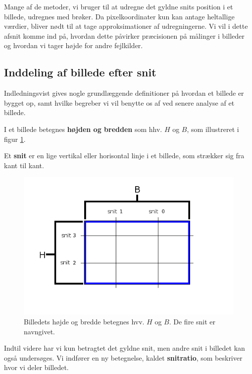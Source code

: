 {
\textsf{
Mange af de metoder, vi bruger til at udregne det gyldne snits position
i et billede, udregnes med brøker. Da pixelkoordinater kun kan antage
heltallige værdier, bliver nødt til at tage approksimationer af
udregningerne. Vi vil i dette afsnit komme ind på, hvordan dette
påvirker præcisionen på målinger i billeder og hvordan vi tager højde
for andre fejlkilder.
}

\subsection{Inddeling af billede efter snit}
Indledningsvist gives nogle grundlæggende definitioner på hvordan et
billede er bygget op, samt hvilke begreber vi vil benytte os af ved
senere analyse af et billede.

\begin{definition}
	I et billede betegnes \textbf{højden og bredden} som hhv. $H$ og
	$B$, som illustreret i figur \ref{cut}.
\end{definition}

\begin{definition}
    Et \textbf{snit} er en lige vertikal eller horisontal linje i et
    billede, som strækker sig fra kant til kant.
\end{definition}

\begin{figure}[!ht]
    \centering
    \includegraphics[scale=0.42,angle=0]{afsnit/vores_implementation/billeder/naiv_algoritme/Cut}
    \caption[]{Billedets højde og bredde betegnes hvv. $H$ og $B$. De
    fire snit er navngivet.}
    \label{cut}
\end{figure}

Indtil videre har vi kun betragtet det gyldne snit, men andre snit i
billedet kan også undersøges. Vi indfører en ny betegnelse, kaldet
\textbf{snitratio}, som beskriver hvor vi deler billedet.

}
